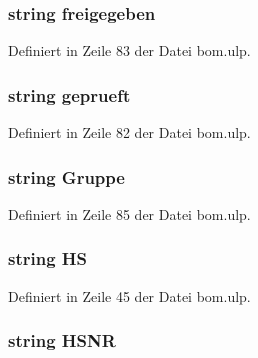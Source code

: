\hypertarget{bom_8ulp_a06d333dc9622bc3a8b4e590022c75297}{}
\subsubsection[{freigegeben}]{\setlength{\rightskip}{0pt plus 5cm}string freigegeben}\label{bom_8ulp_a06d333dc9622bc3a8b4e590022c75297}


Definiert in Zeile 83 der Datei bom.\+ulp.

\hypertarget{bom_8ulp_a285b7e5593b6948aedaaba97394ca9ac}{}
\subsubsection[{geprueft}]{\setlength{\rightskip}{0pt plus 5cm}string geprueft}\label{bom_8ulp_a285b7e5593b6948aedaaba97394ca9ac}


Definiert in Zeile 82 der Datei bom.\+ulp.

\hypertarget{bom_8ulp_a47d4dad2288e4e9d400c39dc34630b01}{}
\subsubsection[{Gruppe}]{\setlength{\rightskip}{0pt plus 5cm}string Gruppe}\label{bom_8ulp_a47d4dad2288e4e9d400c39dc34630b01}


Definiert in Zeile 85 der Datei bom.\+ulp.

\hypertarget{bom_8ulp_a76c4b2a7bb59b91514af25d07c1b8075}{}
\subsubsection[{H\+S}]{\setlength{\rightskip}{0pt plus 5cm}string H\+S}\label{bom_8ulp_a76c4b2a7bb59b91514af25d07c1b8075}


Definiert in Zeile 45 der Datei bom.\+ulp.

\hypertarget{bom_8ulp_a61fcfd309e437276f500730e1bfa1074}{}
\subsubsection[{H\+S\+N\+R}]{\setlength{\rightskip}{0pt plus 5cm}string H\+S\+N\+R}\label{bom_8ulp_a61fcfd309e437276f500730e1bfa1074}


